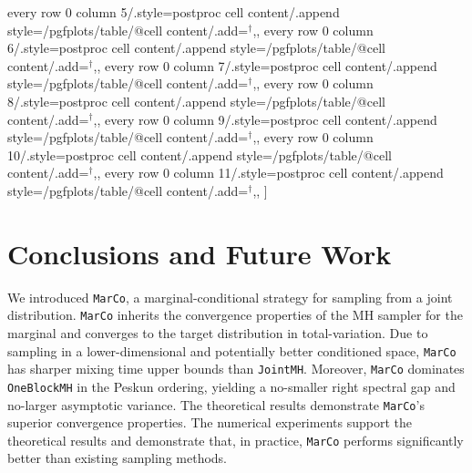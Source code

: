 \documentclass[onefignum,onetabnum]{siamonline250211}
\newcommand{\bfx}{{\bf x}}
\newcommand{\MarCo}{\textnormal{\texttt{MarCo}}\xspace}
\newcommand{\Joint}{\textnormal{\texttt{JointMH}}\xspace}
\newcommand{\OneblockMCMC}{\textnormal{\texttt{OneBlockMH}}\xspace}
\begin{document}
\begin{table}[!htb]
{        every row 0 column 5/.style={postproc cell content/.append style={/pgfplots/table/@cell content/.add={}{}${}^\dagger$,}},
        every row 0 column 6/.style={postproc cell content/.append style={/pgfplots/table/@cell content/.add={}{}${}^\dagger$,}},
        every row 0 column 7/.style={postproc cell content/.append style={/pgfplots/table/@cell content/.add={}{}${}^\dagger$,}},
        every row 0 column 8/.style={postproc cell content/.append style={/pgfplots/table/@cell content/.add={}{}${}^\dagger$,}},
        every row 0 column 9/.style={postproc cell content/.append style={/pgfplots/table/@cell content/.add={}{}${}^\dagger$,}},
        every row 0 column 10/.style={postproc cell content/.append style={/pgfplots/table/@cell content/.add={}{}${}^\dagger$,}},
        every row 0 column 11/.style={postproc cell content/.append style={/pgfplots/table/@cell content/.add={}{}${}^\dagger$,}},
	]\loadedtablefunnel
}

\caption{
    Minimum $\bfx$-ESS in the Neal's funnel scaling study, averaged over five random trials.
    Column blocks fix the funnel scale $\sigma$ and report conditional dimensions $d$ within each block.
    \MarCo obtains the highest ESS values, approximately twice as large as the ESS of \OneblockMCMC and 2-3 orders of magnitude larger than \Joint.
    For \Joint, $\dagger$ denotes that at least one of trials failed to satisfy $\text{split-$\hat R$} < 1.01$. Hence, ESS values should be interpreted with caution.
}
\label{tab:funnel_scaling_min_ess_x}
\end{table}
 
%
\section{Conclusions and Future Work}
\label{sec:conclusions}

We introduced \MarCo, a marginal-conditional strategy for sampling from a joint distribution.
%
\MarCo inherits the convergence properties of the MH sampler for the marginal and converges to the target distribution in total-variation. Due to sampling in a lower-dimensional and potentially better conditioned space, \MarCo has sharper mixing time upper bounds than \Joint.
Moreover, \MarCo dominates \OneblockMCMC in the Peskun ordering, yielding a no-smaller right spectral gap and no-larger asymptotic variance. The theoretical results demonstrate \MarCo's superior convergence properties. The numerical experiments support the theoretical results and demonstrate that, in practice, \MarCo performs significantly better than existing sampling methods.
\end{document}
